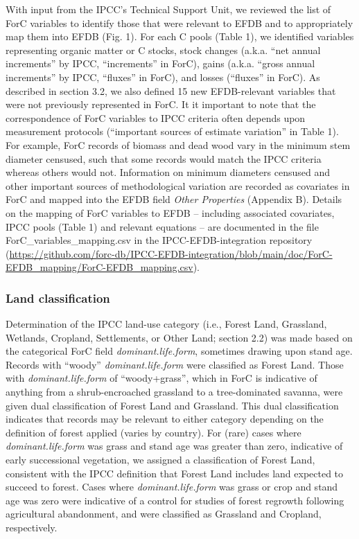 \documentclass[, manuscript]{copernicus}
\begin{document}
With input from the IPCC's Technical Support Unit, we reviewed the list
of ForC variables to identify those that were relevant to EFDB and to
appropriately map them into EFDB (Fig. 1). For each C pools (Table 1),
we identified variables representing organic matter or C stocks, stock
changes (a.k.a. ``net annual increments'' by IPCC, ``increments'' in
ForC), gains (a.k.a. ``gross annual increments'' by IPCC, ``fluxes'' in
ForC), and losses (``fluxes'' in ForC). As described in section 3.2, we
also defined 15 new EFDB-relevant variables that were not previously
represented in ForC. It it important to note that the correspondence of
ForC variables to IPCC criteria often depends upon measurement protocols
(``important sources of estimate variation'' in Table 1). For example,
ForC records of biomass and dead wood vary in the minimum stem diameter
censused, such that some records would match the IPCC criteria whereas
others would not. Information on minimum diameters censused and other
important sources of methodological variation are recorded as covariates
in ForC and mapped into the EFDB field \emph{Other Properties} (Appendix
B). Details on the mapping of ForC variables to EFDB -- including
associated covariates, IPCC pools (Table 1) and relevant equations
\citep{ipcc_2006_2006} -- are documented in the file
ForC\_variables\_mapping.csv in the IPCC-EFDB-integration repository
(\url{https://github.com/forc-db/IPCC-EFDB-integration/blob/main/doc/ForC-EFDB_mapping/ForC-EFDB_mapping.csv}).

\subsubsection{Land classification}

Determination of the IPCC land-use category (i.e., Forest Land,
Grassland, Wetlands, Cropland, Settlements, or Other Land; section 2.2)
was made based on the categorical ForC field \emph{dominant.life.form},
sometimes drawing upon stand age. Records with ``woody''
\emph{dominant.life.form} were classified as Forest Land. Those with
\emph{dominant.life.form} of ``woody+grass'', which in ForC is
indicative of anything from a shrub-encroached grassland to a
tree-dominated savanna, were given dual classification of Forest Land
and Grassland. This dual classification indicates that records may be
relevant to either category depending on the definition of forest
applied (varies by country). For (rare) cases where
\emph{dominant.life.form} was grass and stand age was greater than zero,
indicative of early successional vegetation, we assigned a
classification of Forest Land, consistent with the IPCC definition that
Forest Land includes land expected to succeed to forest. Cases where
\emph{dominant.life.form} was grass or crop and stand age was zero were
indicative of a control for studies of forest regrowth following
agricultural abandonment, and were classified as Grassland and Cropland,
respectively.
\end{document}
